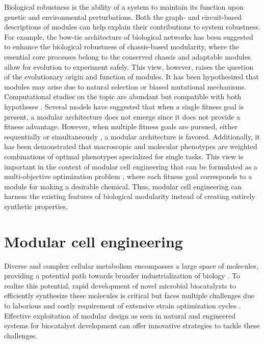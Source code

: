 Biological robustness is the ability of a system to maintain its function upon genetic and environmental perturbations.
Both the graph- and circuit-based descriptions of modules \citep{whitacre2012} can help explain their contributions to system robustness.
For example, the bow-tie architecture of biological networks \citep{friedlander2015} has been suggested \citep{kitano2004} to enhance the biological robustness of chassis-based modularity, where the essential core processes belong to the conserved chassis and adaptable modules allow for evolution to experiment safely.
This view, however, raises the question of the evolutionary origin and function of modules.
It has been hypothesized that modules may arise due to natural selection or biased mutational mechanisms.
Computational studies on the topic are abundant but compatible with both hypotheses \citep{wagner2007}.
Several models have suggested that when a single fitness goal is present, a modular architecture does not emerge since it does not provide a fitness advantage.
However, when multiple fitness goals are pursued, either sequentially \citep{kashtan2007} or simultaneously \citep{clune2013}, a modular architecture is favored.
Additionally, it has been demonstrated that macroscopic \citep{shoval2012} and molecular \citep{schuetz2012} phenotypes are weighted combinations of optimal phenotypes specialized for single tasks.
This view is important in the context of modular cell engineering that can be formulated as a multi-objective optimization problem \citep{garcia2019}, where each fitness goal corresponds to a module for making a desirable chemical.
Thus, modular cell engineering can harness the existing features of biological modularity instead of creating entirely synthetic properties.

\section{Modular cell engineering}

Diverse and complex cellular metabolism encompasses a large space of molecules, providing a potential path towards broader industrialization of biology \citep{connelly2015}.
To realize this potential, rapid development of novel microbial biocatalysts to efficiently synthesize these molecules is critical but faces multiple challenges due to laborious and costly requirement of extensive strain optimization cycles \citep{nielsen2016, trinh2016}.
Effective exploitation of modular design as seen in natural and engineered systems for biocatalyst development can offer innovative strategies to tackle these challenges.

